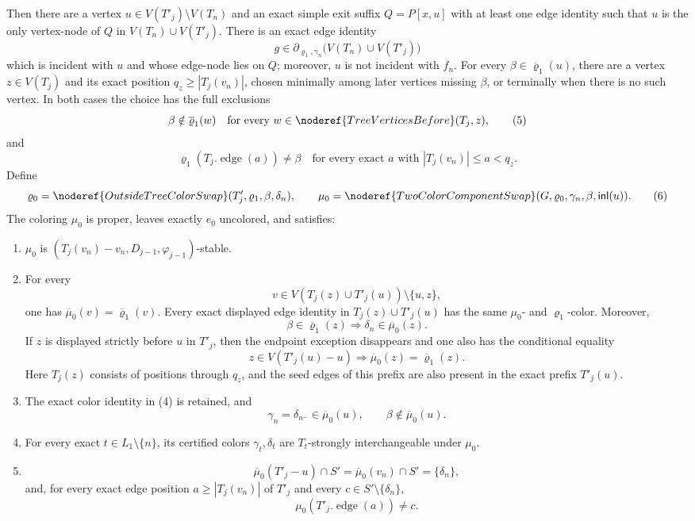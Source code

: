 \begin{lemma}
Then there are a vertex \(u\in V(T'_j)\setminus V(T_n)\) and an exact
simple exit suffix \(Q=P[x,u]\) with at least one edge identity such that
\(u\) is the only vertex-node of \(Q\) in
\(V(T_n)\cup V(T'_j)\).  There is an exact edge identity
\[
 g\in\partial_{\varrho_1,\gamma_n}
       \bigl(V(T_n)\cup V(T'_j)\bigr)
\]
which is incident with \(u\) and whose edge-node lies on \(Q\); moreover,
\(u\) is not incident with \(f_n\).  For every
\(\beta\in\overline{\varrho}_1(u)\), there are a vertex \(z\in V(T_j)\)
and its exact position \(q_z\ge |T_j(v_n)|\), chosen minimally among
later vertices missing \(\beta\), or terminally when there is no such
vertex.  In both cases the choice has the full exclusions
\[
 \beta\notin\overline{\varrho}_1(w)
 \quad\text{for every }w\in\noderef{TreeVerticesBefore}(T_j,z),
                                                               \tag{5}
\]
and
\[
 \varrho_1(T_j.\operatorname{edge}(a))\ne\beta
 \quad\text{for every exact }a\text{ with }
 |T_j(v_n)|\le a<q_z.                                        \tag{5'}
\]
Define
\[
 \varrho_0=
 \noderef{OutsideTreeColorSwap}(T'_j,\varrho_1,\beta,\delta_n),
 \qquad
 \mu_0=
 \noderef{TwoColorComponentSwap}
   (G,\varrho_0,\gamma_n,\beta,\mathsf{inl}(u)).               \tag{6}
\]
The coloring \(\mu_0\) is proper, leaves exactly \(e_0\) uncolored, and
satisfies:
\begin{enumerate}
\item[(e1)] \(\mu_0\) is
 \((T_j(v_n)-v_n,D_{j-1},\varphi_{j-1})\)-stable.
\item[(e2)] For every
 \[
  v\in V(T_j(z)\cup T'_j(u))\setminus\{u,z\},
 \]
 one has
 \(\overline{\mu}_0(v)=\overline{\varrho}_1(v)\).  Every exact displayed
 edge identity in \(T_j(z)\cup T'_j(u)\) has the same \(\mu_0\)- and
 \(\varrho_1\)-color.  Moreover,
 \[
  \beta\in\overline{\varrho}_1(z)
  \Longrightarrow \delta_n\in\overline{\mu}_0(z).
 \]
 If \(z\) is displayed strictly before \(u\) in \(T'_j\), then the
 endpoint exception disappears and one also has the conditional equality
 \[
  z\in V(T'_j(u)-u)
  \Longrightarrow
  \overline\mu_0(z)=\overline{\varrho}_1(z).                 \tag{e2z}
 \]
 Here \(T_j(z)\) consists of positions through \(q_z\), and the seed
 edges of this prefix are also present in the exact prefix \(T'_j(u)\).
\item[(e3)] The exact color identity in (4) is retained, and
 \[
  \gamma_n=\delta_{n^-}\in\overline{\mu}_0(u),
  \qquad \beta\notin\overline{\mu}_0(u).
 \]
\item[(e4)] For every exact \(t\in L_1\setminus\{n\}\), its certified
 colors \(\gamma_t,\delta_t\) are \(T_t\)-strongly interchangeable under
 \(\mu_0\).
\item[(e5)]
 \[
 \overline{\mu}_0(T'_j-u)\cap S'
 =\overline{\mu}_0(v_n)\cap S'=\{\delta_n\},
 \]
 and, for every exact edge position \(a\ge |T_j(v_n)|\) of \(T'_j\)
 and every \(c\in S'\setminus\{\delta_n\}\),
 \[
                  \mu_0(T'_j.\operatorname{edge}(a))\ne c .
 \]
\end{enumerate}
\end{lemma}
